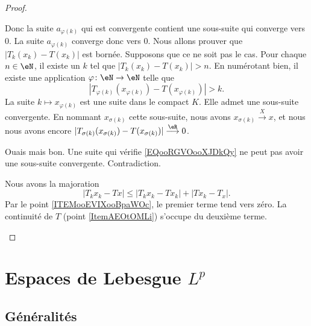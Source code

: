 \begin{proof}
\begin{subproof}
\begin{subproof}
			Donc la suite \( a_{\varphi(k)}\) qui est convergente contient une sous-suite qui converge vers \( 0\). La suite \( a_{\varphi(k)}\) converge donc vers \( 0\).
			Nous allons prouver que \( | T_k(x_k)-T(x_k) |\) est bornée. Supposons que ce ne soit pas le cas. Pour chaque \( n\in \eN\), il existe un \( k\) tel que \( | T_k(x_k)-T(x_k) |>n\). En numérotant bien, il existe une application \( \varphi\colon \eN\to \eN\) telle que
			\begin{equation}        \label{EQooRGVOooXJDkQy}
				| T_{\varphi(k)}(x_{\varphi(k)})-T(x_{\varphi(k)}) |>k.
			\end{equation}
			La suite \( k\mapsto x_{\varphi(k)}\) est une suite dans le compact \( K\). Elle admet une sous-suite convergente. En nommant \( x_{\sigma(k)}\) cette sous-suite, nous avons \( x_{\sigma(k)}\stackrel{X}{\longrightarrow}x\), et nous nous avons encore \( | T_{\sigma(k)}(x_{\sigma(k)})-T(x_{\sigma(k)}) |\stackrel{\eR}{\longrightarrow}0\).

			Ouais mais bon. Une suite qui vérifie \eqref{EQooRGVOooXJDkQy} ne peut pas avoir une sous-suite convergente. Contradiction.
		\end{subproof}
		Nous avons la majoration
		\begin{equation}
			| T_kx_k-Tx |\leq | T_kx_k-Tx_k |+| Tx_k-T_x |.
		\end{equation}
		Par le point \ref{ITEMooEVIXooBpaWOc}, le premier terme tend vers zéro. La continuité de \( T\) (point \ref{ItemAEOtOMLi}) s'occupe du deuxième terme.
	\end{subproof}
\end{proof}




\section{Espaces de Lebesgue \texorpdfstring{\( L^p\)}{Lp}}
\label{SecVKiVIQK}

\subsection{Généralités}

